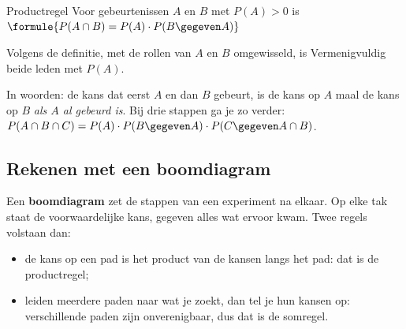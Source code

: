 \begin{theorie}
\begin{stelling}{Productregel}
Voor gebeurtenissen $A$ en $B$ met $P(A) > 0$ is \quad $\formule{P(A \cap B) = P(A) \cdot P(B \gegeven A)}$
\end{stelling}

\begin{bewijs}
Volgens de definitie, met de rollen van $A$ en $B$ omgewisseld, is
Vermenigvuldig beide leden met $P(A)$.
\end{bewijs}
\end{theorie}

In woorden: de kans dat eerst $A$ en dan $B$ gebeurt, is de kans op $A$ maal de kans op $B$ \textit{als $A$ al gebeurd is}. Bij drie stappen ga je zo verder: $P(A \cap B \cap C) = P(A) \cdot P(B \gegeven A) \cdot P(C \gegeven A \cap B)$.


\begin{oefeningen}
\end{oefeningen}

\subsection{Rekenen met een boomdiagram}

Een \textbf{boomdiagram} zet de stappen van een experiment na elkaar. Op elke tak staat de voorwaardelijke kans, gegeven alles wat ervoor kwam. Twee regels volstaan dan:
\begin{itemize}
\item de kans op een pad is het product van de kansen langs het pad: dat is de productregel;
\item leiden meerdere paden naar wat je zoekt, dan tel je hun kansen op: verschillende paden zijn onverenigbaar, dus dat is de somregel.
\end{itemize}

